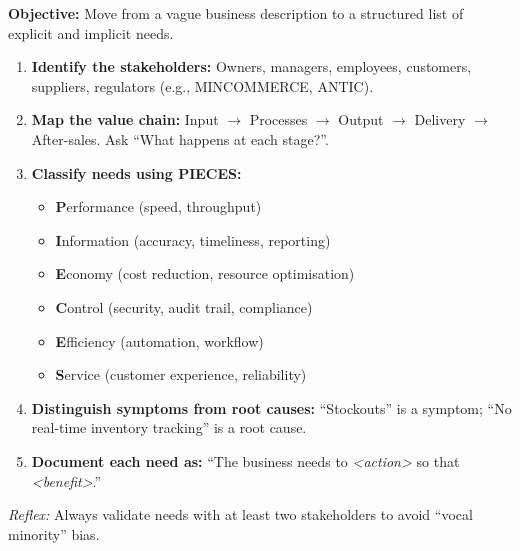 \documentclass[11pt]{article}
\begin{document}
\begin{methode}
\textbf{Objective:} Move from a vague business description to a structured list of explicit and implicit needs.
\begin{enumerate}
    \item \textbf{Identify the stakeholders:} Owners, managers, employees, customers, suppliers, regulators (e.g., MINCOMMERCE, ANTIC).
    \item \textbf{Map the value chain:} Input $\to$ Processes $\to$ Output $\to$ Delivery $\to$ After-sales. Ask ``What happens at each stage?''.
    \item \textbf{Classify needs using PIECES:}
    \begin{itemize}
        \item \textbf{P}erformance (speed, throughput)
        \item \textbf{I}nformation (accuracy, timeliness, reporting)
        \item \textbf{E}conomy (cost reduction, resource optimisation)
        \item \textbf{C}ontrol (security, audit trail, compliance)
        \item \textbf{E}fficiency (automation, workflow)
        \item \textbf{S}ervice (customer experience, reliability)
    \end{itemize}
    \item \textbf{Distinguish symptoms from root causes:} ``Stockouts'' is a symptom; ``No real-time inventory tracking'' is a root cause.
    \item \textbf{Document each need as:} ``The business needs to \emph{<action>} so that \emph{<benefit>}.''
\end{enumerate}
\emph{Reflex:} Always validate needs with at least two stakeholders to avoid ``vocal minority'' bias.
\end{methode}
\end{document}
